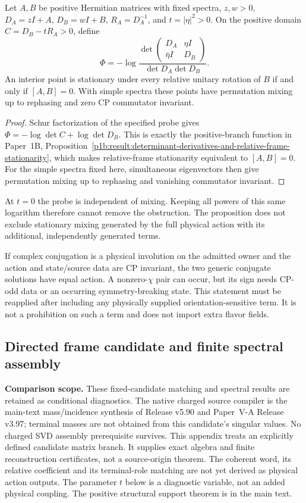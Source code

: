 \documentclass[11pt,a4paper]{article}
\begin{document}
\begin{proposition}
\label{p6:prop:v203-full-probe-stationarity}
Let $A,B$ be positive Hermitian matrices with fixed spectra, $z,w>0$,
$D_A=zI+A$, $D_B=wI+B$, $R_A=D_A^{-1}$, and $t=|\eta|^2>0$.
On the positive domain $C=D_B-tR_A>0$, define
\[
 \Phi=-\log\frac{\det\left(\begin{smallmatrix}D_A&\eta I\\
                      \bar\eta I&D_B\end{smallmatrix}\right)}
                         {\det D_A\det D_B}.
\]
An interior point is stationary under every relative unitary rotation of
$B$ if and only if $[A,B]=0$. With simple spectra these points have
permutation mixing up to rephasing and zero CP commutator invariant.
\end{proposition}
\begin{proof}
Schur factorization of the specified probe gives
$\Phi=-\log\det C+\log\det D_B$. This is exactly the positive-branch
function in Paper~1B,
Proposition~\ref{p1b:result:determinant-derivatives-and-relative-frame-stationarity},
which makes relative-frame stationarity equivalent to $[A,B]=0$.
For the simple spectra fixed here, simultaneous eigenvectors then give
permutation mixing up to rephasing and vanishing commutator invariant.
\end{proof}
At $t=0$ the probe is independent of mixing. Keeping all powers of this
same logarithm therefore cannot remove the obstruction. The proposition
does not exclude stationary mixing generated by the full physical action
with its additional, independently generated terms.


If complex conjugation is a physical involution on the admitted owner and
the action and state/source data are CP invariant, the two generic conjugate
solutions have equal action.  A nonzero-\(\chi\) pair can occur, but its
sign needs CP-odd data or an occurring symmetry-breaking state.  This
statement must be reapplied after including any physically supplied
orientation-sensitive term.  It is not a prohibition on such a term and
does not import extra flavor fields.

\subsection{Directed frame candidate and finite spectral assembly}
\label{p6:app:v585-directed-assembly}
\noindent\textbf{Comparison scope.} These fixed-candidate matching and
spectral results are retained as conditional diagnostics. The native charged
source compiler is the main-text mass/incidence synthesis of Release v5.90
and Paper~V-A Release v3.97; terminal masses are not obtained from this
candidate's singular values. No charged SVD assembly prerequisite survives.
This appendix treats an explicitly defined candidate matrix branch. It
supplies exact algebra and finite reconstruction certificates, not a
source-origin theorem. The coherent word, its relative coefficient and
its terminal-role matching are not yet derived as physical action outputs.
The parameter $t$ below is a diagnostic variable, not an added physical
coupling. The positive structural support theorem is in the main text.
\end{document}
